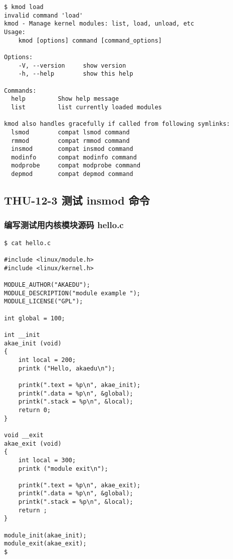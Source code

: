 \documentclass[11pt,a4paper]{article}
\begin{document}
{\begin{shaded}\begin{verbatim}
$ kmod load
invalid command 'load'
kmod - Manage kernel modules: list, load, unload, etc
Usage:
    kmod [options] command [command_options]

Options:
    -V, --version     show version
    -h, --help        show this help

Commands:
  help         Show help message
  list         list currently loaded modules

kmod also handles gracefully if called from following symlinks:
  lsmod        compat lsmod command
  rmmod        compat rmmod command
  insmod       compat insmod command
  modinfo      compat modinfo command
  modprobe     compat modprobe command
  depmod       compat depmod command
\end{verbatim}\end{shaded}}
\subsection{THU-12-3 测试 insmod 命令}

\subsubsection{编写测试用内核模块源码 hello.c}

{\begin{shaded}\begin{verbatim}
$ cat hello.c 

#include <linux/module.h>
#include <linux/kernel.h>

MODULE_AUTHOR("AKAEDU");
MODULE_DESCRIPTION("module example ");
MODULE_LICENSE("GPL");

int global = 100;

int __init 
akae_init (void)
{
    int local = 200;
    printk ("Hello, akaedu\n");

    printk(".text = %p\n", akae_init);
    printk(".data = %p\n", &global);
    printk(".stack = %p\n", &local);
    return 0;
}

void __exit
akae_exit (void)
{
    int local = 300;
    printk ("module exit\n");

    printk(".text = %p\n", akae_exit);
    printk(".data = %p\n", &global);
    printk(".stack = %p\n", &local);
    return ;
}

module_init(akae_init);
module_exit(akae_exit);
$ 
\end{verbatim}\end{shaded}}
\end{document}
